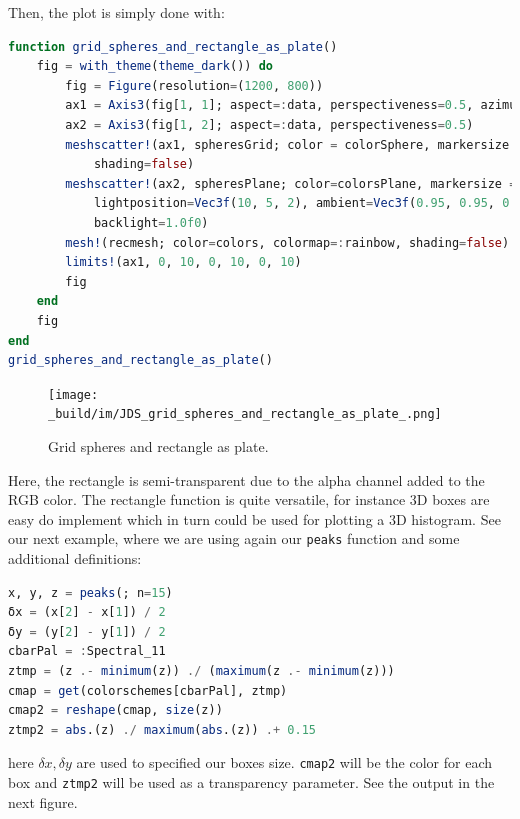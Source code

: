 \documentclass[
  notoc %
]{tufte-book}
\newcommand{\passthrough}[1]{#1}
\begin{document}
Then, the plot is simply done with:

\begin{lstlisting}[language=Julia]
function grid_spheres_and_rectangle_as_plate()
    fig = with_theme(theme_dark()) do
        fig = Figure(resolution=(1200, 800))
        ax1 = Axis3(fig[1, 1]; aspect=:data, perspectiveness=0.5, azimuth=0.72)
        ax2 = Axis3(fig[1, 2]; aspect=:data, perspectiveness=0.5)
        meshscatter!(ax1, spheresGrid; color = colorSphere, markersize = 1,
            shading=false)
        meshscatter!(ax2, spheresPlane; color=colorsPlane, markersize = 0.75,
            lightposition=Vec3f(10, 5, 2), ambient=Vec3f(0.95, 0.95, 0.95),
            backlight=1.0f0)
        mesh!(recmesh; color=colors, colormap=:rainbow, shading=false)
        limits!(ax1, 0, 10, 0, 10, 0, 10)
        fig
    end
    fig
end
grid_spheres_and_rectangle_as_plate()
\end{lstlisting}

\begin{figure}
\hypertarget{fig:grid_spheres_and_rectangle_as_plate}{%
\centering
\texttt{[image: \_build/im/JDS\_grid\_spheres\_and\_rectangle\_as\_plate\_.png]}
\caption{Grid spheres and rectangle as
plate.}\label{fig:grid_spheres_and_rectangle_as_plate}
}
\end{figure}

Here, the rectangle is semi-transparent due to the alpha channel added
to the RGB color. The rectangle function is quite versatile, for
instance 3D boxes are easy do implement which in turn could be used for
plotting a 3D histogram. See our next example, where we are using again
our \passthrough{\lstinline!peaks!} function and some additional
definitions:

\begin{lstlisting}[language=Julia]
x, y, z = peaks(; n=15)
δx = (x[2] - x[1]) / 2
δy = (y[2] - y[1]) / 2
cbarPal = :Spectral_11
ztmp = (z .- minimum(z)) ./ (maximum(z .- minimum(z)))
cmap = get(colorschemes[cbarPal], ztmp)
cmap2 = reshape(cmap, size(z))
ztmp2 = abs.(z) ./ maximum(abs.(z)) .+ 0.15
\end{lstlisting}

here \(\delta x, \delta y\) are used to specified our boxes size.
\passthrough{\lstinline!cmap2!} will be the color for each box and
\passthrough{\lstinline!ztmp2!} will be used as a transparency
parameter. See the output in the next figure.
\end{document}
